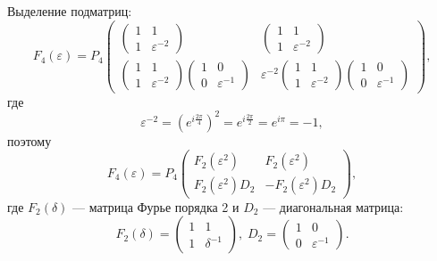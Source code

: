 Выделение подматриц:
\[
    F_4(\varepsilon)
    = P_4 \begin{pmatrix}
              \begin{pmatrix}
                  1 & 1                \\
                  1 & \varepsilon^{-2}
              \end{pmatrix}
              &
              \begin{pmatrix}
                  1 & 1                \\
                  1 & \varepsilon^{-2}
              \end{pmatrix} \\
              \begin{pmatrix}
                  1 & 1                \\
                  1 & \varepsilon^{-2}
              \end{pmatrix}
              \begin{pmatrix}
                  1 & 0                \\
                  0 & \varepsilon^{-1}
              \end{pmatrix}
              &
              \varepsilon^{-2}
              \begin{pmatrix}
                  1 & 1                \\
                  1 & \varepsilon^{-2}
              \end{pmatrix}
              \begin{pmatrix}
                  1 & 0                \\
                  0 & \varepsilon^{-1}
              \end{pmatrix}
    \end{pmatrix} ,
\]
где
\[
    \varepsilon^{-2}
    = \left( e^{i \frac{2 \pi}{4}} \right)^2
    = e^{i \frac{2 \pi}{2}}
    = e^{i \pi}
    = -1 ,
\]
поэтому
\[
    F_4(\varepsilon)
    = P_4
    \begin{pmatrix}
        F_2(\varepsilon^2)     & F_2(\varepsilon^2)       \\
        F_2(\varepsilon^2) D_2 & - F_2(\varepsilon^2) D_2
    \end{pmatrix} ,
\]
где $F_2(\delta)$ --- матрица Фурье порядка 2 и $D_2$ --- диагональная матрица:
\[
    F_2(\delta)
    = \begin{pmatrix}
          1 & 1           \\
          1 & \delta^{-1}
    \end{pmatrix} ,
    \;
    D_2
    = \begin{pmatrix}
          1 & 0                \\
          0 & \varepsilon^{-1}
    \end{pmatrix} .
\]
